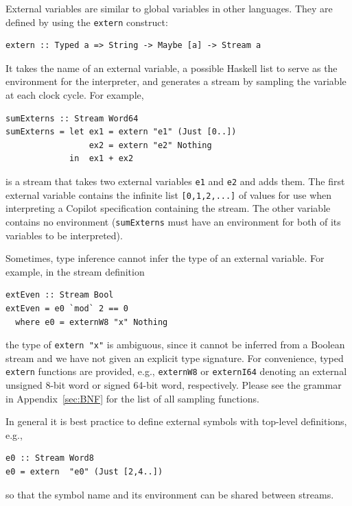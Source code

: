 External variables are similar to global variables in other languages. They 
are defined by using the {\tt extern} construct:
%
\begin{lstlisting}[language = Copilot, frame = single]
extern :: Typed a => String -> Maybe [a] -> Stream a
\end{lstlisting}
%
\noindent
It takes the name of an external variable, a possible Haskell list to serve as
the environment for the interpreter, and generates a stream by sampling the
variable at each clock cycle.  For example,
%
\begin{lstlisting}[language = Copilot, frame = single]
sumExterns :: Stream Word64
sumExterns = let ex1 = extern "e1" (Just [0..])
                 ex2 = extern "e2" Nothing
             in  ex1 + ex2
\end{lstlisting}
%
is a stream that takes two external variables {\tt e1} and {\tt e2} and adds
them.  The first external variable contains the infinite list {\tt [0,1,2,...]}
of values for use when interpreting a Copilot specification containing the
stream.  The other variable contains no environment ({\tt sumExterns} must have
an environment for both of its variables to be interpreted).

Sometimes, type inference cannot infer the type of an external variable.  For
example, in the stream definition
%
\begin{lstlisting}[language = Copilot, frame = single]
extEven :: Stream Bool
extEven = e0 `mod` 2 == 0
  where e0 = externW8 "x" Nothing 
\end{lstlisting}
%
\noindent
the type of {\tt extern "x"} is ambiguous, since it cannot be inferred from a
Boolean stream and we have not given an explicit type signature.  For
convenience, typed {\tt extern} functions are provided, e.g., {\tt externW8} or
{\tt externI64} denoting an external unsigned 8-bit word or signed 64-bit word,
respectively. Please see the grammar in Appendix~\ref{sec:BNF} for the list of
all sampling functions.

In general it is best practice to define external symbols with
top-level definitions, e.g.,
%
\begin{lstlisting}[language = Copilot, frame = single]
e0 :: Stream Word8
e0 = extern  "e0" (Just [2,4..])
\end{lstlisting}

\noindent
so that the symbol name and its environment can be shared between streams.

